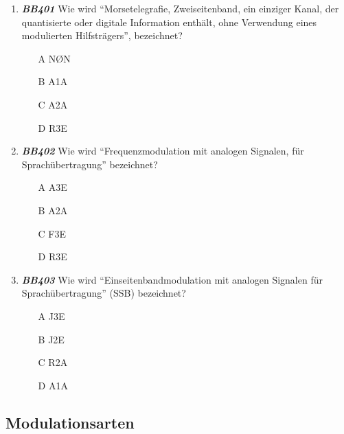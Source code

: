 \begin{enumerate} 
	\item \emph{\textbf{BB401}}  Wie wird ``Morsetelegrafie, Zweiseitenband, ein einziger Kanal, der quantisierte oder digitale Information enthält, ohne Verwendung eines modulierten Hilfsträgers'', bezeichnet?
	\begin{enumerate}
	\itemsep1pt\parskip0pt
		\item[A] NØN
		\item[B] A1A
		\item[C] A2A
		\item[D] R3E
	\end{enumerate} 
	\item \emph{\textbf{BB402}}  Wie wird ``Frequenzmodulation mit analogen Signalen, für Sprachübertragung'' bezeichnet?
	\begin{enumerate}
	\itemsep1pt\parskip0pt
		\item[A] A3E
		\item[B] A2A
		\item[C] F3E
		\item[D] R3E
	\end{enumerate} 
	\item \emph{\textbf{BB403}}  Wie wird ``Einseitenbandmodulation mit analogen Signalen für Sprachübertragung'' (SSB) bezeichnet?
	\begin{enumerate}
	\itemsep1pt\parskip0pt
		\item[A] J3E
		\item[B] J2E
		\item[C] R2A
		\item[D] A1A
	\end{enumerate} 
\end{enumerate}

\subsection*{Modulationsarten}

